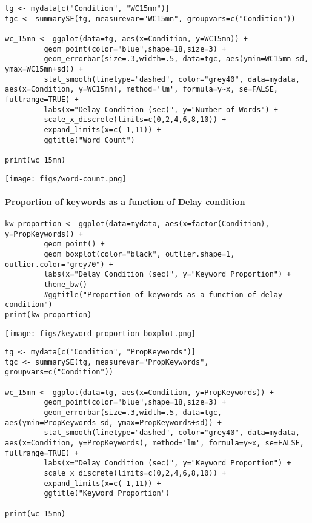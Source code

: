 \documentclass[10pt]{article}
\begin{document}
\begin{verbatim}
tg <- mydata[c("Condition", "WC15mn")]
tgc <- summarySE(tg, measurevar="WC15mn", groupvars=c("Condition"))

wc_15mn <- ggplot(data=tg, aes(x=Condition, y=WC15mn)) +
	     geom_point(color="blue",shape=18,size=3) +
	     geom_errorbar(size=.3,width=.5, data=tgc, aes(ymin=WC15mn-sd, ymax=WC15mn+sd)) +
	     stat_smooth(linetype="dashed", color="grey40", data=mydata, aes(x=Condition, y=WC15mn), method='lm', formula=y~x, se=FALSE, fullrange=TRUE) +
	     labs(x="Delay Condition (sec)", y="Number of Words") +
	     scale_x_discrete(limits=c(0,2,4,6,8,10)) +
	     expand_limits(x=c(-1,11)) +
	     ggtitle("Word Count")

print(wc_15mn)
\end{verbatim}

\texttt{[image: figs/word-count.png]}

\paragraph*{Proportion of keywords as a function of Delay condition}
\label{sec-2-2-1-5}

\begin{verbatim}
kw_proportion <- ggplot(data=mydata, aes(x=factor(Condition), y=PropKeywords)) +
	     geom_point() +
	     geom_boxplot(color="black", outlier.shape=1, outlier.color="grey70") + 
	     labs(x="Delay Condition (sec)", y="Keyword Proportion") + 
	     theme_bw()
	     #ggtitle("Proportion of keywords as a function of delay condition")
print(kw_proportion)
\end{verbatim}

\texttt{[image: figs/keyword-proportion-boxplot.png]}

\begin{verbatim}
tg <- mydata[c("Condition", "PropKeywords")]
tgc <- summarySE(tg, measurevar="PropKeywords", groupvars=c("Condition"))

wc_15mn <- ggplot(data=tg, aes(x=Condition, y=PropKeywords)) +
	     geom_point(color="blue",shape=18,size=3) +
	     geom_errorbar(size=.3,width=.5, data=tgc, aes(ymin=PropKeywords-sd, ymax=PropKeywords+sd)) +
	     stat_smooth(linetype="dashed", color="grey40", data=mydata, aes(x=Condition, y=PropKeywords), method='lm', formula=y~x, se=FALSE, fullrange=TRUE) +
	     labs(x="Delay Condition (sec)", y="Keyword Proportion") +
	     scale_x_discrete(limits=c(0,2,4,6,8,10)) +
	     expand_limits(x=c(-1,11)) +
	     ggtitle("Keyword Proportion")

print(wc_15mn)
\end{verbatim}
\end{document}
